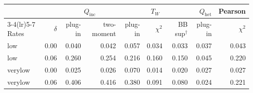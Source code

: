 \begin{tabular}{lrrrrrrrr}
\toprule
 & & \multicolumn{2}{c}{$Q_{\mathrm{inc}}$} & \multicolumn{3}{c}{$T_W$} & $Q_{\mathrm{het}}$ & Pearson \\
\cmidrule(lr){3-4}\cmidrule(lr){5-7}
Rates & $\delta$ & plug-in & two-moment & plug-in & $\chi^2$ & BB sup$^{\dagger}$ & plug-in & $\chi^2$ \\
\midrule
low & 0.00 & 0.040 & 0.042 & 0.057 & 0.034 & 0.033 & 0.037 & 0.043 \\
low & 0.06 & 0.260 & 0.254 & 0.216 & 0.160 & 0.150 & 0.045 & 0.220 \\
verylow & 0.00 & 0.025 & 0.026 & 0.070 & 0.014 & 0.020 & 0.027 & 0.027 \\
verylow & 0.06 & 0.406 & 0.416 & 0.380 & 0.091 & 0.080 & 0.024 & 0.221 \\
\bottomrule
\end{tabular}
